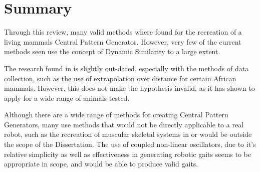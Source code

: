 








\section{Summary}
Through this review, many valid methods where found for the recreation of a living mammals Central Pattern Generator. However, very few of the current methods seen use the concept of Dynamic Similarity to a large extent.

The research found in \cite{Alexander1983} is slightly out-dated, especially with the methods of data collection, such as the use of extrapolation over distance for certain African mammals. However, this does not make the hypothesis invalid, as it has shown to apply for a wide range of animals tested.

Although there are a wide range of methods for creating Central Pattern Generators, many use methods that would not be directly applicable to a real robot, such as the recreation of muscular skeletal systems in \cite{Geijtenbeek2013} or would be outside the scope of the Dissertation. The use of coupled non-linear oscillators, due to it's relative simplicity as well as effectiveness in generating robotic gaits seems to be appropriate in scope, and would be able to produce valid gaits.

